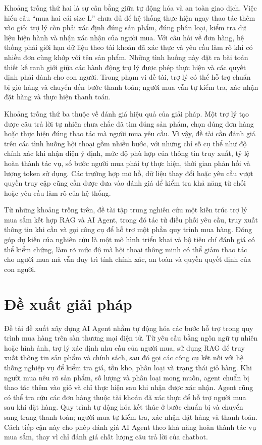 \documentclass[12pt,a4paper,oneside]{report}
\begin{document}
Khoảng trống thứ hai là sự cân bằng giữa tự động hóa và an toàn giao dịch. Việc hiểu câu “mua hai cái size L” chưa đủ để hệ thống thực hiện ngay thao tác thêm vào giỏ: trợ lý còn phải xác định đúng sản phẩm, đúng phân loại, kiểm tra dữ liệu hiện hành và nhận xác nhận của người mua. Với câu hỏi về đơn hàng, hệ thống phải giới hạn dữ liệu theo tài khoản đã xác thực và yêu cầu làm rõ khi có nhiều đơn cùng khớp với tên sản phẩm. Những tình huống này đặt ra bài toán thiết kế ranh giới giữa các hành động trợ lý được phép thực hiện và các quyết định phải dành cho con người. Trong phạm vi đề tài, trợ lý có thể hỗ trợ chuẩn bị giỏ hàng và chuyển đến bước thanh toán; người mua vẫn tự kiểm tra, xác nhận đặt hàng và thực hiện thanh toán.

Khoảng trống thứ ba thuộc về đánh giá hiệu quả của giải pháp. Một trợ lý tạo được câu trả lời tự nhiên chưa chắc đã tìm đúng sản phẩm, chọn đúng đơn hàng hoặc thực hiện đúng thao tác mà người mua yêu cầu. Vì vậy, đề tài cần đánh giá trên các tình huống hội thoại gồm nhiều bước, với những chỉ số cụ thể như độ chính xác khi nhận diện ý định, mức độ phù hợp của thông tin truy xuất, tỷ lệ hoàn thành tác vụ, số bước người mua phải tự thực hiện, thời gian phản hồi và lượng token sử dụng. Các trường hợp mơ hồ, dữ liệu thay đổi hoặc yêu cầu vượt quyền truy cập cũng cần được đưa vào đánh giá để kiểm tra khả năng từ chối hoặc yêu cầu làm rõ của hệ thống.

Từ những khoảng trống trên, đề tài tập trung nghiên cứu một kiến trúc trợ lý mua sắm kết hợp RAG và AI Agent, trong đó tác tử điều phối yêu cầu, truy xuất thông tin khi cần và gọi công cụ để hỗ trợ một phần quy trình mua hàng. Đóng góp dự kiến của nghiên cứu là một mô hình triển khai và bộ tiêu chí đánh giá có thể kiểm chứng, làm rõ mức độ mà hội thoại thông minh có thể giảm thao tác cho người mua mà vẫn duy trì tính chính xác, an toàn và quyền quyết định của con người.

\section{Đề xuất giải pháp}
Đề tài đề xuất xây dựng AI Agent nhằm tự động hóa các bước hỗ trợ trong quy trình mua hàng trên sàn thương mại điện tử. Từ yêu cầu bằng ngôn ngữ tự nhiên hoặc hình ảnh, trợ lý xác định nhu cầu của người mua, sử dụng RAG để truy xuất thông tin sản phẩm và chính sách, sau đó gọi các công cụ kết nối với hệ thống nghiệp vụ để kiểm tra giá, tồn kho, phân loại và trạng thái giỏ hàng. Khi người mua nêu rõ sản phẩm, số lượng và phân loại mong muốn, agent chuẩn bị thao tác thêm vào giỏ và chỉ thực hiện sau khi nhận được xác nhận. Agent cũng có thể tra cứu các đơn hàng thuộc tài khoản đã xác thực để hỗ trợ người mua sau khi đặt hàng. Quy trình tự động hóa kết thúc ở bước chuẩn bị và chuyển sang trang thanh toán; người mua tự kiểm tra, xác nhận đặt hàng và thanh toán. Cách tiếp cận này cho phép đánh giá AI Agent theo khả năng hoàn thành tác vụ mua sắm, thay vì chỉ đánh giá chất lượng câu trả lời của chatbot.
\end{document}
